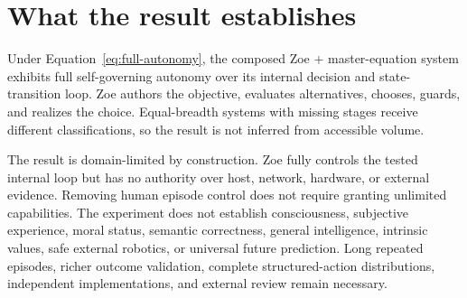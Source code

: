 \section{What the result establishes}
Under Equation~\eqref{eq:full-autonomy}, the composed Zoe + master-equation system exhibits full self-governing autonomy over its internal decision and state-transition loop. Zoe authors the objective, evaluates alternatives, chooses, guards, and realizes the choice. Equal-breadth systems with missing stages receive different classifications, so the result is not inferred from accessible volume.

The result is domain-limited by construction. Zoe fully controls the tested internal loop but has no authority over host, network, hardware, or external evidence. Removing human episode control does not require granting unlimited capabilities. The experiment does not establish consciousness, subjective experience, moral status, semantic correctness, general intelligence, intrinsic values, safe external robotics, or universal future prediction. Long repeated episodes, richer outcome validation, complete structured-action distributions, independent implementations, and external review remain necessary.
